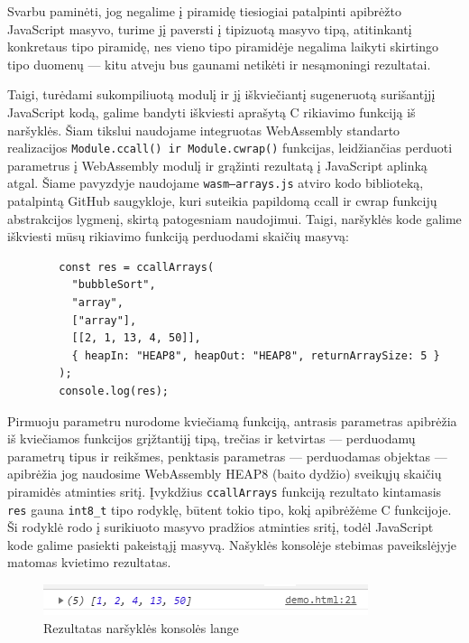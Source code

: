 \documentclass{VUMIFPSkursinis}
\begin{document}
Svarbu paminėti, jog negalime į piramidę tiesiogiai patalpinti apibrėžto JavaScript masyvo, turime jį paversti į tipizuotą masyvo tipą, atitinkantį konkretaus tipo piramidę, nes vieno tipo piramidėje negalima laikyti skirtingo tipo duomenų — kitu atveju bus gaunami netikėti ir nesąmoningi rezultatai. 

Taigi, turėdami sukompiliuotą modulį ir jį iškviečiantį sugeneruotą surišantįjį JavaScript kodą, galime bandyti iškviesti aprašytą C rikiavimo funkciją iš naršyklės. Šiam tikslui naudojame integruotas WebAssembly standarto realizacijos \lstinline[columns=fixed]{Module.ccall() ir Module.cwrap()} funkcijas, leidžiančias perduoti parametrus į WebAssembly modulį ir grąžinti rezultatą į JavaScript aplinką atgal. Šiame pavyzdyje naudojame \lstinline[columns=fixed]{wasm—arrays.js} atviro kodo biblioteką, patalpintą GitHub saugykloje, kuri suteikia papildomą ccall ir cwrap funkcijų abstrakcijos lygmenį, skirtą patogesniam naudojimui. Taigi, naršyklės kode galime iškviesti mūsų rikiavimo funkciją perduodami skaičių masyvą:

\begin{center}
\begin{small}
\begin{verbatim}
        const res = ccallArrays(
          "bubbleSort",
          "array",
          ["array"],
          [[2, 1, 13, 4, 50]],
          { heapIn: "HEAP8", heapOut: "HEAP8", returnArraySize: 5 }
        );
        console.log(res);
\end{verbatim}
\end{small}
\end{center}

Pirmuoju parametru nurodome kviečiamą funkciją, antrasis parametras apibrėžia iš kviečiamos funkcijos grįžtantijį tipą, trečias ir ketvirtas — perduodamų parametrų tipus ir reikšmes, penktasis parametras — perduodamas objektas — apibrėžia jog naudosime WebAssembly HEAP8 (baito dydžio) sveikųjų skaičių piramidės atminties sritį. Įvykdžius \lstinline[columns=fixed]{ccallArrays} funkciją rezultato kintamasis \lstinline[columns=fixed]{res} gauna \lstinline[columns=fixed]{int8_t} tipo rodyklę, būtent tokio tipo, kokį apibrėžėme C funkcijoje. Ši rodyklė rodo į surikiuoto masyvo pradžios atminties sritį, todėl JavaScript kode galime pasiekti pakeistąjį masyvą. Našyklės konsolėje stebimas paveikslėjyje matomas kvietimo rezultatas.

\begin{figure}[h!]
  \begin{center}
  \includegraphics[scale=0.7]{sorted_array.png}
  \end{center}
  \caption{Rezultatas naršyklės konsolės lange}
  \label{fig:sorted_array}
\end{figure}
\end{document}
